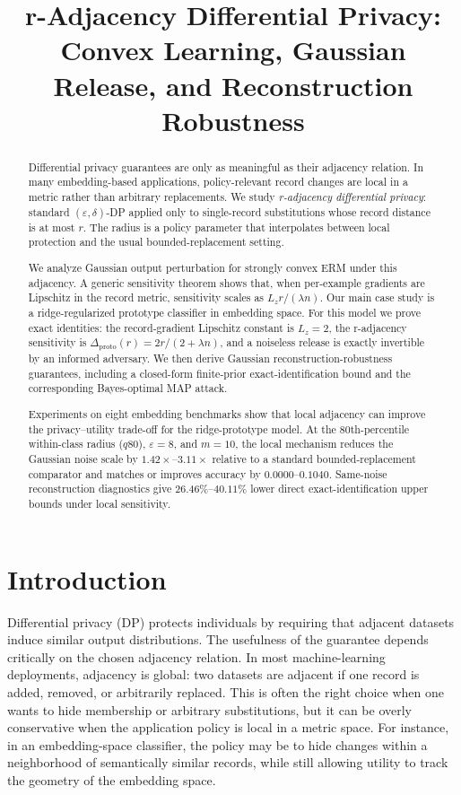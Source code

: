 \documentclass[conference,compsoc]{IEEEtran}
\title{r-Adjacency Differential Privacy:\\Convex Learning, Gaussian Release, and Reconstruction Robustness}
\author{}
\begin{document}
\maketitle

\begin{abstract}
Differential privacy guarantees are only as meaningful as their adjacency relation. In many embedding-based applications, policy-relevant record changes are local in a metric rather than arbitrary replacements. We study \emph{r-adjacency differential privacy}: standard $(\varepsilon,\delta)$-DP applied only to single-record substitutions whose record distance is at most $r$. The radius is a policy parameter that interpolates between local protection and the usual bounded-replacement setting.

We analyze Gaussian output perturbation for strongly convex ERM under this adjacency. A generic sensitivity theorem shows that, when per-example gradients are Lipschitz in the record metric, sensitivity scales as $L_z r/(\lambda n)$. Our main case study is a ridge-regularized prototype classifier in embedding space. For this model we prove exact identities: the record-gradient Lipschitz constant is $L_z=2$, the r-adjacency sensitivity is $\Delta_{\mathrm{proto}}(r)=2r/(2+\lambda n)$, and a noiseless release is exactly invertible by an informed adversary. We then derive Gaussian reconstruction-robustness guarantees, including a closed-form finite-prior exact-identification bound and the corresponding Bayes-optimal MAP attack.

Experiments on eight embedding benchmarks show that local adjacency can improve the privacy--utility trade-off for the ridge-prototype model. At the 80th-percentile within-class radius ($q80$), $\varepsilon=8$, and $m=10$, the local mechanism reduces the Gaussian noise scale by $1.42\times$--$3.11\times$ relative to a standard bounded-replacement comparator and matches or improves accuracy by $0.0000$--$0.1040$. Same-noise reconstruction diagnostics give $26.46\%$--$40.11\%$ lower direct exact-identification upper bounds under local sensitivity.
\end{abstract}

\section{Introduction}
Differential privacy (DP) protects individuals by requiring that adjacent datasets induce similar output distributions. The usefulness of the guarantee depends critically on the chosen adjacency relation. In most machine-learning deployments, adjacency is global: two datasets are adjacent if one record is added, removed, or arbitrarily replaced. This is often the right choice when one wants to hide membership or arbitrary substitutions, but it can be overly conservative when the application policy is local in a metric space. For instance, in an embedding-space classifier, the policy may be to hide changes within a neighborhood of semantically similar records, while still allowing utility to track the geometry of the embedding space.
\end{document}
